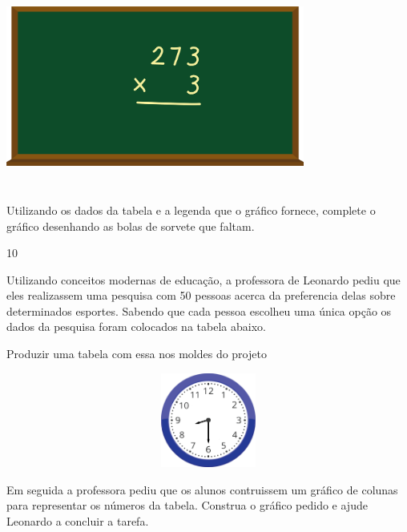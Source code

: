 \begin{escolha}
\begin{escolha}
\includegraphics[width=3.86538in,height=2.63899in]{media/image99.png}

Utilizando os dados da tabela e a legenda que o gráfico fornece,
complete o gráfico desenhando as bolas de sorvete que faltam.


\num{10}

Utilizando conceitos modernas de educação, a professora de Leonardo
pediu que eles realizassem uma pesquisa com 50 pessoas acerca da
preferencia delas sobre determinados esportes. Sabendo que cada pessoa
escolheu uma única opção os dados da pesquisa foram colocados na tabela
abaixo.

Produzir uma tabela com essa nos moldes do projeto

\includegraphics[width=5.39213in,height=1.22511in]{media/image100.png}

Em seguida a professora pediu que os alunos contruissem um gráfico de
colunas para representar os números da tabela. Construa o gráfico pedido
e ajude Leonardo a concluir a tarefa.


\end{escolha}
\end{escolha}
